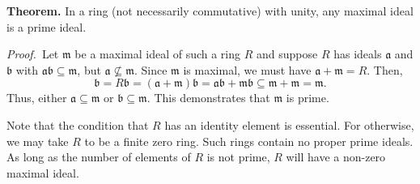 \documentclass[12pt]{article}
\begin{document}
\textbf{Theorem.} In a ring (not necessarily commutative) with unity, any maximal ideal is a prime ideal.

{\em Proof.}\, Let $\mathfrak{m}$ be a maximal ideal of such a ring $R$
and suppose $R$ has ideals $\mathfrak{a}$
and $\mathfrak{b}$ with $\mathfrak{a}\mathfrak{b} \subseteq \mathfrak{m}$,
but $\mathfrak{a} \nsubseteq \mathfrak{m}$.
Since $\mathfrak{m}$ is maximal, we must have $\mathfrak{a} + \mathfrak{m} = R$.
Then,
$$\mathfrak{b} = R\mathfrak{b} = (\mathfrak{a} + \mathfrak{m})\mathfrak{b}
= \mathfrak{a}\mathfrak{b} + \mathfrak{m}\mathfrak{b} \subseteq \mathfrak{m} + \mathfrak{m}
= \mathfrak{m}.$$
Thus, either $\mathfrak{a} \subseteq \mathfrak{m}$ or $\mathfrak{b} \subseteq \mathfrak{m}$.  This demonstrates that $\mathfrak{m}$ is prime.

Note that the condition that $R$ has an identity element is essential.  For otherwise, we may take $R$ to be a finite zero ring.  Such rings contain no proper prime ideals.  As long as the number of elements of $R$ is not prime, $R$ will have a non-zero maximal ideal. 


\end{document}
